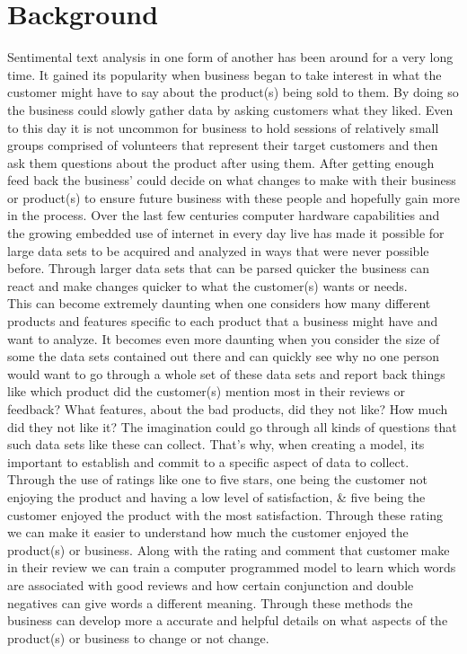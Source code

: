 \documentclass[twoside,twocolumn]{article}
\begin{document}

\section{Background}

Sentimental text analysis in one form of another has been around for a very long time.  It gained its popularity when business began to take interest in what the customer might have to say about the product(s) being sold to them.  By doing so the business could slowly gather data by asking customers what they liked.  Even to this day it is not uncommon for business to hold sessions of relatively small groups comprised of volunteers that represent their target customers and then ask them questions about the product after using them.  After getting enough feed back the business' could decide on what changes to make with their business or product(s) to ensure future business with these people and hopefully gain more in the process.  Over the last few centuries computer hardware capabilities and the growing embedded use of internet in every day live has made it possible for large data sets to be acquired and analyzed in ways that were never possible before.  Through larger data sets that can be parsed quicker the business can react and make changes quicker to what the customer(s) wants or needs.  \\
\indent This can become extremely daunting when one considers how many different products and features specific to each product that a business might have and want to analyze.  It becomes even more daunting when you consider the size of some the data sets contained out there and can quickly see why no one person would want to go through a whole set of these data sets and report back things like which product did the customer(s) mention most in their reviews or feedback?  What features, about the bad products, did they not like?  How much did they not like it?  The imagination could go through all kinds of questions that such data sets like these can collect.  That's why, when creating a model, its important to establish and commit to a specific aspect of data to collect.  Through the use of ratings like one to five stars, one being the customer not enjoying the product and having a low level of satisfaction, \& five being the customer enjoyed the product with the most satisfaction.  Through these rating we can make it easier to understand how much the customer enjoyed the product(s) or business.  Along with the rating and comment that customer make in their review we can train a computer programmed model to learn which words are associated with good reviews and how certain conjunction and double negatives can give words a different meaning.  Through these methods the business can develop more a accurate and helpful details on what aspects of the product(s) or business to change or not change.\\
\end{document}
